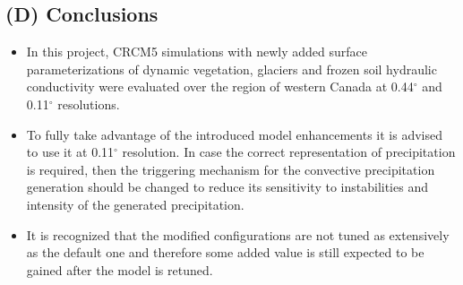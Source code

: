 \documentclass[a0b,landscape]{a0poster}
\begin{document}
\begin{multicols*}{4}
{
  \color{SaddleBrown} %

  \section*{(D) Conclusions}

  \begin{itemize}
  \item In this project, CRCM5 simulations with newly added surface parameterizations of dynamic vegetation,
  glaciers and frozen soil hydraulic conductivity were evaluated over the region of western Canada at 0.44$^\circ$ and 0.11$^\circ$ resolutions.
  \item To fully take advantage of the introduced model enhancements it is advised to use it at 0.11$^\circ$ resolution. In case the
        correct representation of precipitation is required, then the triggering
        mechanism for the convective precipitation generation should be changed to reduce its sensitivity to instabilities and intensity of the generated precipitation.
  \item It is recognized that the modified configurations are not tuned as extensively as the default one and therefore
  some added value is still expected to be gained after the model is retuned.
  \end{itemize}
}

\footnotesize
%

\end{multicols*}
\end{document}
